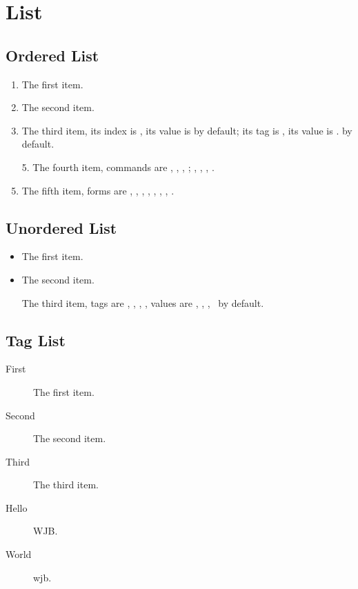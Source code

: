 \section{List}
\subsection{Ordered List}
\begin{enumerate}
    \item The first item.
    \item The second item.
    \item The third item, its index is \theenumi, its value is  by default; its tag is , its value is \theenumi. by default.
    \item[5.] The fourth item,  commands are \theenumi, \theenumii, \theenumiii, \theenumiv; , , , .
    \item The fifth item, forms are , , , , , , , .
\end{enumerate}

\subsection{Unordered List}
\begin{itemize}
    \item The first item.
    \item The second item.
    \item[\dag] The third item, tags are , , , , values are \textbullet, {\normalfont\bfseries \textendash}, \textasteriskcentered, \textperiodcentered\ by default.
\end{itemize}

\subsection{Tag List}
\begin{description}
    \item[First] The first item.
    \item[Second] The second item.
    \item[Third] The third item. 
\end{description}

{\renewcommand\descriptionlabel[1]{\normalfont\Large\itshape \textbullet\ #1}
\begin{description}
    \item[Hello] WJB.
    \item[World] wjb.
\end{description}
}

